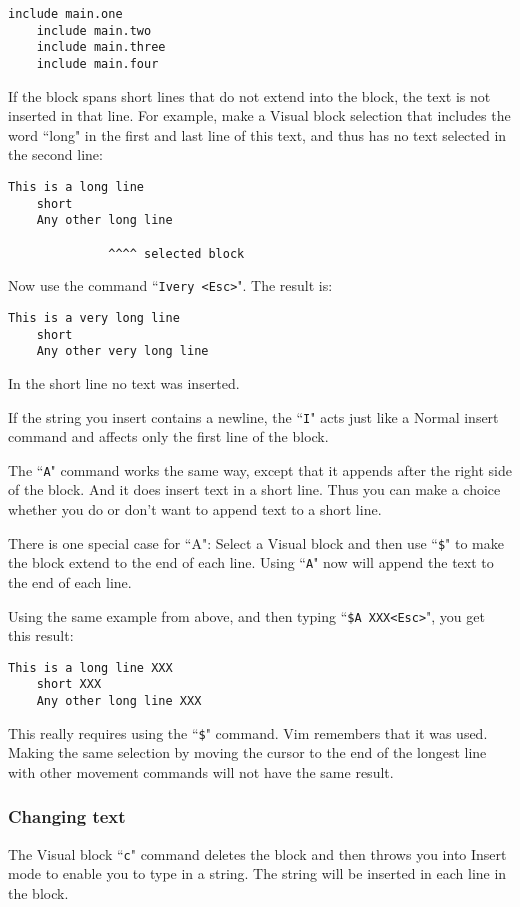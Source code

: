 \begin{Verbatim}[samepage=true]
    include main.one
    include main.two
    include main.three
    include main.four
\end{Verbatim}

If the block spans short lines that do not extend into the block, the text is not inserted in that line.
For example, make a Visual block selection that includes the word ``long" in the first and last line of this text, and thus has no text selected in the second line:

\begin{Verbatim}[samepage=true]
    This is a long line
    short
    Any other long line

              ^^^^ selected block
\end{Verbatim}

Now use the command ``\texttt{Ivery <Esc>}".
The result is:

\begin{Verbatim}[samepage=true]
    This is a very long line
    short
    Any other very long line
\end{Verbatim}

In the short line no text was inserted.

If the string you insert contains a newline, the ``\texttt{I}" acts just like a Normal insert command and affects only the first line of the block.

The ``\texttt{A}" command works the same way, except that it appends after the right side of the block.
And it does insert text in a short line.
Thus you can make a choice whether you do or don't want to append text to a short line.

There is one special case for ``A": Select a Visual block and then use ``\texttt{\$}" to make the block extend to the end of each line.
Using ``\texttt{A}" now will append the text to the end of each line.

Using the same example from above, and then typing ``\texttt{\$A XXX<Esc>}", you get this result:

\begin{Verbatim}[samepage=true]
    This is a long line XXX
    short XXX
    Any other long line XXX
\end{Verbatim}

This really requires using the ``\texttt{\$}" command.
Vim remembers that it was used.
Making the same selection by moving the cursor to the end of the longest line with other movement commands will not have the same result.
\subsubsection{Changing text}
The Visual block ``\texttt{c}" command deletes the block and then throws you into Insert mode to enable you to type in a string.
The string will be inserted in each line in the block.

